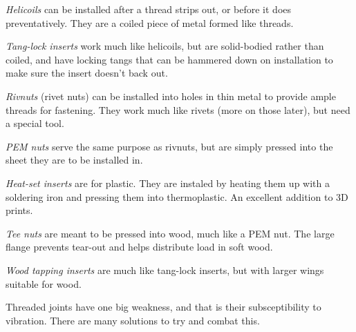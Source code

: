\documentclass[10pt,letterpaper]{book}
\begin{document}
	\begin{asparaenum}[a)]
		\item \textit{Helicoils} can be installed after a thread strips out, or before it does preventatively. They are a coiled piece of metal formed like threads.
		\item \textit{Tang-lock inserts} work much like helicoils, but are solid-bodied rather than coiled, and have locking tangs that can be hammered down on installation to make sure the insert doesn't back out.
		\item \textit{Rivnuts} (rivet nuts) can be installed into holes in thin metal to provide ample threads for fastening. They work much like rivets (more on those later), but need a special tool.
		\item \textit{PEM nuts} serve the same purpose as rivnuts, but are simply pressed into the sheet they are to be installed in.
		\item \textit{Heat-set inserts} are for plastic. They are instaled by heating them up with a soldering iron and pressing them into thermoplastic. An excellent addition to 3D prints.
		\item \textit{Tee nuts} are meant to be pressed into wood, much like a PEM nut. The large flange prevents tear-out and helps distribute load in soft wood.
		\item \textit{Wood tapping inserts} are much like tang-lock inserts, but with larger wings suitable for wood.
	\end{asparaenum}
	
	Threaded joints have one big weakness, and that is their subsceptibility to vibration. There are many solutions to try and combat this.
	
\end{document}
